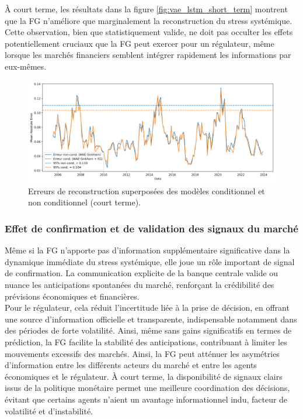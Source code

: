 À court terme, les résultats dans la figure \autoref{fig:vae_lstm_short_term} montrent que la FG n’améliore que marginalement la reconstruction du stress systémique. Cette observation, bien que statistiquement valide, ne doit pas occulter les effets potentiellement cruciaux que la FG peut exercer pour un régulateur, même lorsque les marchés financiers semblent intégrer rapidement les informations par eux-mêmes.

\begin{figure}[H]
    \centering
    \includegraphics[width=0.9\linewidth]{images/results_ct.png}
    \caption{Erreurs de reconstruction superposées des modèles conditionnel et non conditionnel (court terme).}
    \label{fig:vae_lstm_short_term}
\end{figure}

\subsubsection{Effet de confirmation et de validation des signaux du marché}

Même si la FG n’apporte pas d’information supplémentaire significative dans la dynamique immédiate du stress systémique, elle joue un rôle important de signal de confirmation. La communication explicite de la banque centrale valide ou nuance les anticipations spontanées du marché, renforçant la crédibilité des prévisions économiques et financières.\\

Pour le régulateur, cela réduit l’incertitude liée à la prise de décision, en offrant une source d’information officielle et transparente, indispensable notamment dans des périodes de forte volatilité. Ainsi, même sans gains significatifs en termes de prédiction, la FG facilite la stabilité des anticipations, contribuant à limiter les mouvements excessifs des marchés. Ainsi, la FG peut atténuer les asymétries d’information entre les différents acteurs du marché et entre les agents économiques et le régulateur. À court terme, la disponibilité de signaux clairs issus de la politique monétaire permet une meilleure coordination des décisions, évitant que certains agents n’aient un avantage informationnel indu, facteur de volatilité et d’instabilité.\\

